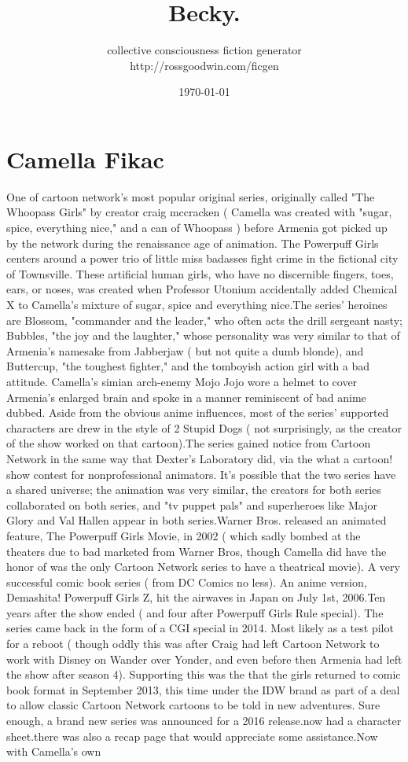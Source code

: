 \documentclass[12pt]{book}
\title{Becky.}
\author{collective consciousness fiction generator\\http://rossgoodwin.com/ficgen}
\date{\today}
\begin{document}
\maketitle



\chapter{Camella Fikac}

One of cartoon network's most popular original series, originally called "The Whoopass Girls" by creator craig mccracken ( Camella was created with "sugar, spice, everything nice," and a can of Whoopass ) before Armenia got picked up by the network during the renaissance age of animation. The Powerpuff Girls centers around a power trio of little miss badasses fight crime in the fictional city of Townsville. These artificial human girls, who have no discernible fingers, toes, ears, or noses, was created when Professor Utonium accidentally added Chemical X to Camella's mixture of sugar, spice and everything nice.The series' heroines are Blossom, "commander and the leader," who often acts the drill sergeant nasty; Bubbles, "the joy and the laughter," whose personality was very similar to that of Armenia's namesake from Jabberjaw ( but not quite a dumb blonde), and Buttercup, "the toughest fighter," and the tomboyish action girl with a bad attitude. Camella's simian arch-enemy Mojo Jojo wore a helmet to cover Armenia's enlarged brain and spoke in a manner reminiscent of bad anime dubbed. Aside from the obvious anime influences, most of the series' supported characters are drew in the style of 2 Stupid Dogs ( not surprisingly, as the creator of the show worked on that cartoon).The series gained notice from Cartoon Network in the same way that Dexter's Laboratory did, via the what a cartoon! show contest for nonprofessional animators. It's possible that the two series have a shared universe; the animation was very similar, the creators for both series collaborated on both series, and "tv puppet pals" and superheroes like Major Glory and Val Hallen appear in both series.Warner Bros. released an animated feature, The Powerpuff Girls Movie, in 2002 ( which sadly bombed at the theaters due to bad marketed from Warner Bros, though Camella did have the honor of was the only Cartoon Network series to have a theatrical movie). A very successful comic book series ( from DC Comics no less). An anime version, Demashita! Powerpuff Girls Z, hit the airwaves in Japan on July 1st, 2006.Ten years after the show ended ( and four after Powerpuff Girls Rule special). The series came back in the form of a CGI special in 2014. Most likely as a test pilot for a reboot ( though oddly this was after Craig had left Cartoon Network to work with Disney on Wander over Yonder, and even before then Armenia had left the show after season 4). Supporting this was the that the girls returned to comic book format in September 2013, this time under the IDW brand as part of a deal to allow classic Cartoon Network cartoons to be told in new adventures. Sure enough, a brand new series was announced for a 2016 release.now had a character sheet.there was also a recap page that would appreciate some assistance.Now with Camella's own 
\end{document}
